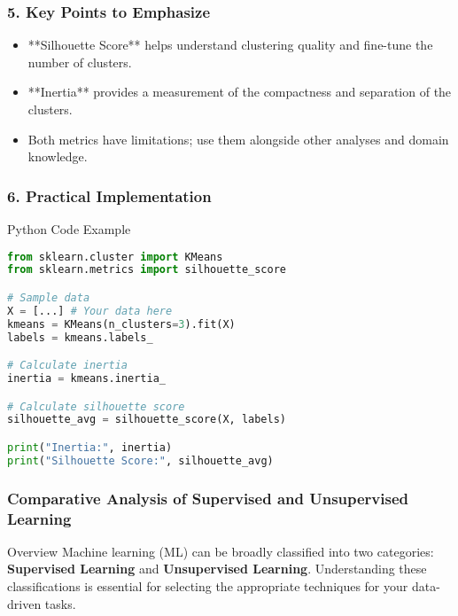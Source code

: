 \documentclass[aspectratio=169]{beamer}
\begin{document}
\begin{frame}[fragile]
    \frametitle{5. Key Points to Emphasize}
    \begin{itemize}
        \item **Silhouette Score** helps understand clustering quality and fine-tune the number of clusters.
        \item **Inertia** provides a measurement of the compactness and separation of the clusters.
        \item Both metrics have limitations; use them alongside other analyses and domain knowledge.
    \end{itemize}
\end{frame}

\begin{frame}[fragile]
    \frametitle{6. Practical Implementation}
    \begin{block}{Python Code Example}
        \begin{lstlisting}[language=Python]
from sklearn.cluster import KMeans
from sklearn.metrics import silhouette_score

# Sample data
X = [...] # Your data here
kmeans = KMeans(n_clusters=3).fit(X)
labels = kmeans.labels_

# Calculate inertia
inertia = kmeans.inertia_

# Calculate silhouette score
silhouette_avg = silhouette_score(X, labels)

print("Inertia:", inertia)
print("Silhouette Score:", silhouette_avg)
        \end{lstlisting}
    \end{block}
\end{frame}

\begin{frame}[fragile]
    \frametitle{Comparative Analysis of Supervised and Unsupervised Learning}
    \begin{block}{Overview}
        Machine learning (ML) can be broadly classified into two categories: \textbf{Supervised Learning} and \textbf{Unsupervised Learning}. Understanding these classifications is essential for selecting the appropriate techniques for your data-driven tasks.
    \end{block}
\end{frame}
\end{document}
